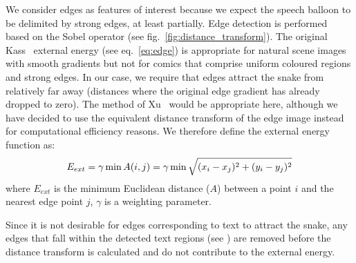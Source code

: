 \documentclass[conference]{IEEEtran}
\begin{document}
We consider edges as features of interest because we expect the speech balloon to be delimited by strong edges, at least partially. Edge detection is performed based on the Sobel operator (see fig.~\ref{fig:distance_transform}).
The original Kass~\cite{Kass1988} external energy (see eq.~\ref{eq:edge}) is appropriate for natural scene images with smooth gradients but not for comics that comprise uniform coloured regions and strong edges. In our case, we require that edges attract the snake from relatively far away (distances where the original edge gradient has already dropped to zero). The method of Xu~\cite{Xu1998} would be appropriate here, although we have decided to use the equivalent distance transform of the edge image instead for computational efficiency reasons. We therefore define the external energy function as:
\begin{equation}\label{eq:energy3}
  E_{ext} = \gamma \min A(i,j) = \gamma \min  \sqrt{(x_i-x_j)^2+(y_i-y_j)^2}\\
\end{equation}
where $E_{ext}$ is the minimum Euclidean distance ($A$) between a point $i$ and the nearest edge point $j$, $\gamma$ is a weighting parameter.

Since it is not desirable for edges corresponding to text to attract the snake, any edges that fall within the detected text regions (see \cite{Rigaud2013VISAPP}) are removed before the distance transform is calculated and do not contribute to the external energy.

	
\end{document}
